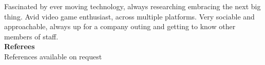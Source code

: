 \documentclass[a4paper,12pt,final,sans]{memoir}
\begin{document}
Fascinated by ever moving technology, always researching embracing the next big thing. Avid video game enthusiast, across multiple platforms. Very sociable and approachable, always up for a company outing and getting to know other members of staff. \\[-0.5em]


\textbf{\textsf{\color{head} \large{Referees} }}\\[-0.9em]

References available on request


\end{document}
